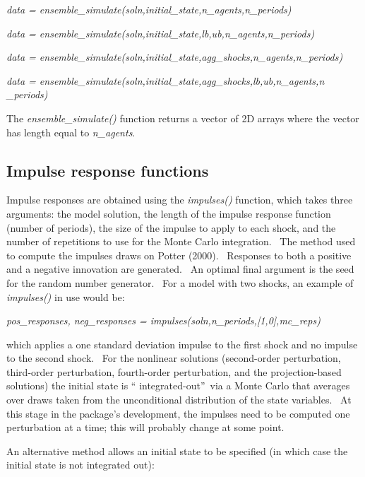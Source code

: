 \documentclass[notitlepage,11pt]{article}
\begin{document}
\bigskip 

\textit{data = ensemble\_simulate(soln,initial\_state,n\_agents,n\_periods)}

\textit{data =
ensemble\_simulate(soln,initial\_state,lb,ub,n\_agents,n\_periods)}

\textit{data =
ensemble\_simulate(soln,initial\_state,agg\_shocks,n\_agents,n\_periods)}

\textit{data =
ensemble\_simulate(soln,initial\_state,agg\_shocks,lb,ub,n\_agents,n%
\_periods)}

\bigskip 

The \textit{ensemble\_simulate()} function returns a vector of 2D arrays
where the vector has length equal to \textit{n\_agents}.

\subsection{Impulse response functions}

Impulse responses are obtained using the \textit{impulses()} function, which
takes three arguments: the model solution, the length of the impulse
response function (number of periods), the size of the impulse to apply to
each shock, and the number of repetitions to use for the Monte Carlo
integration. \ The method used to compute the impulses draws on Potter
(2000). \ Responses to both a positive and a negative innovation are
generated. \ An optimal final argument is the seed for the random number
generator. \ For a model with two shocks, an example of \textit{impulses()}
in use would be:

\bigskip

\textit{pos\_responses, neg\_responses =
impulses(soln,n\_periods,[1,0],mc\_reps)}

\bigskip

which applies a one standard deviation impulse to the first shock and no
impulse to the second shock. \ For the nonlinear solutions (second-order
perturbation, third-order perturbation, fourth-order perturbation, and the
projection-based solutions) the initial state is \textquotedblleft
integrated-out\textquotedblright\ via a Monte Carlo that averages over draws
taken from the unconditional distribution of the state variables. \ At this
stage in the package's development, the impulses need to be computed one
perturbation at a time; this will probably change at some point.

An alternative method allows an initial state to be specified (in which case
the initial state is not integrated out):
\end{document}
